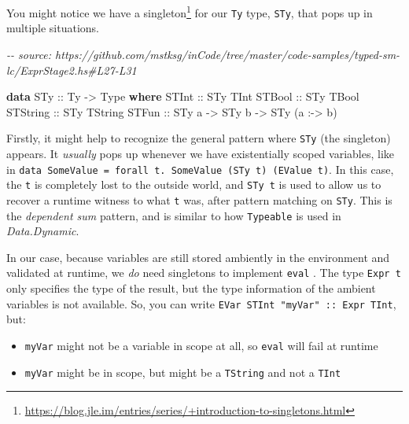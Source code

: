 \documentclass[]{article}
\newenvironment{Shaded}{}{}
\newcommand{\CommentTok}[1]{\textcolor[rgb]{0.38,0.63,0.69}{\textit{#1}}}
\newcommand{\DataTypeTok}[1]{\textcolor[rgb]{0.56,0.13,0.00}{#1}}
\newcommand{\KeywordTok}[1]{\textcolor[rgb]{0.00,0.44,0.13}{\textbf{#1}}}
\newcommand{\NormalTok}[1]{#1}
\newcommand{\OperatorTok}[1]{\textcolor[rgb]{0.40,0.40,0.40}{#1}}
\newcommand{\OtherTok}[1]{\textcolor[rgb]{0.00,0.44,0.13}{#1}}
\renewcommand{\href}[2]{#2\footnote{\url{#1}}}
\begin{document}
You might notice we have a
\href{https://blog.jle.im/entries/series/+introduction-to-singletons.html}{singleton}
for our \texttt{Ty} type, \texttt{STy}, that pops up in multiple situations.

\begin{Shaded}
\begin{Highlighting}[]
\CommentTok{{-}{-} source: https://github.com/mstksg/inCode/tree/master/code{-}samples/typed{-}sm{-}lc/ExprStage2.hs\#L27{-}L31}

\KeywordTok{data} \DataTypeTok{STy}\OtherTok{ ::} \DataTypeTok{Ty} \OtherTok{{-}\textgreater{}} \DataTypeTok{Type} \KeywordTok{where}
  \DataTypeTok{STInt}\OtherTok{ ::} \DataTypeTok{STy} \DataTypeTok{TInt}
  \DataTypeTok{STBool}\OtherTok{ ::} \DataTypeTok{STy} \DataTypeTok{TBool}
  \DataTypeTok{STString}\OtherTok{ ::} \DataTypeTok{STy} \DataTypeTok{TString}
  \DataTypeTok{STFun}\OtherTok{ ::} \DataTypeTok{STy}\NormalTok{ a }\OtherTok{{-}\textgreater{}} \DataTypeTok{STy}\NormalTok{ b }\OtherTok{{-}\textgreater{}} \DataTypeTok{STy}\NormalTok{ (a }\OperatorTok{:{-}\textgreater{}}\NormalTok{ b)}
\end{Highlighting}
\end{Shaded}

Firstly, it might help to recognize the general pattern where \texttt{STy} (the
singleton) appears. It \emph{usually} pops up whenever we have existentially
scoped variables, like in
\texttt{data\ SomeValue\ =\ forall\ t.\ SomeValue\ (STy\ t)\ (EValue\ t)}. In
this case, the \texttt{t} is completely lost to the outside world, and
\texttt{STy\ t} is used to allow us to recover a runtime witness to what
\texttt{t} was, after pattern matching on \texttt{STy}. This is the
\emph{dependent sum} pattern, and is similar to how \texttt{Typeable} is used in
\emph{Data.Dynamic}.

In our case, because variables are still stored ambiently in the environment and
validated at runtime, we \emph{do} need singletons to implement \texttt{eval} .
The type \texttt{Expr\ t} only specifies the type of the result, but the type
information of the ambient variables is not available. So, you can write
\texttt{EVar\ STInt\ "myVar"\ ::\ Expr\ TInt}, but:

\begin{itemize}
\tightlist
\item
  \texttt{myVar} might not be a variable in scope at all, so \texttt{eval} will
  fail at runtime
\item
  \texttt{myVar} might be in scope, but might be a \texttt{TString} and not a
  \texttt{TInt}
\end{itemize}
\end{document}
